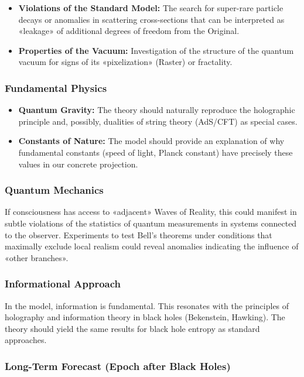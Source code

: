 \documentclass[a4paper,12pt]{article}
\begin{document}
	\begin{itemize}
		\item \textbf{Violations of the Standard Model:} The search for super-rare particle decays or anomalies in scattering cross-sections that can be interpreted as «leakage» of additional degrees of freedom from the Original.
		\item \textbf{Properties of the Vacuum:} Investigation of the structure of the quantum vacuum for signs of its «pixelization» (Raster) or fractality.
	\end{itemize}
	
	\subsubsection{Fundamental Physics}
	
	\begin{itemize}
		\item \textbf{Quantum Gravity:} The theory should naturally reproduce the holographic principle and, possibly, dualities of string theory (AdS/CFT) as special cases.
		\item \textbf{Constants of Nature:} The model should provide an explanation of why fundamental constants (speed of light, Planck constant) have precisely these values in our concrete projection.
	\end{itemize}
	
	\subsubsection{Quantum Mechanics}
	
	If consciousness has access to «adjacent» Waves of Reality, this could manifest in subtle violations of the statistics of quantum measurements in systems connected to the observer. Experiments to test Bell's theorems under conditions that maximally exclude local realism could reveal anomalies indicating the influence of «other branches».
	
	\subsubsection{Informational Approach}
	
	In the model, information is fundamental. This resonates with the principles of holography and information theory in black holes (Bekenstein, Hawking). The theory should yield the same results for black hole entropy as standard approaches.
	
	\subsubsection{Long-Term Forecast (Epoch after Black Holes)}
	
\end{document}
